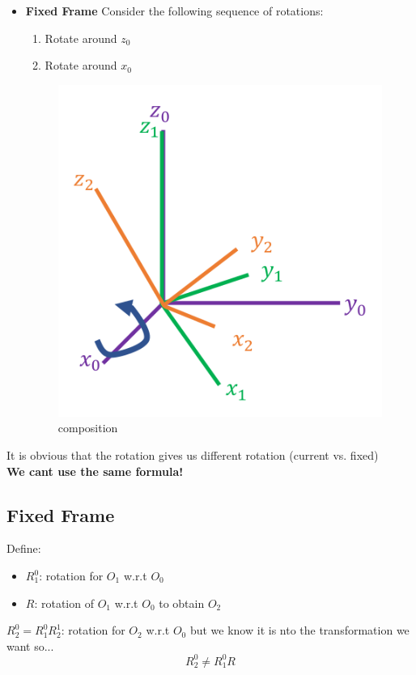 \documentclass{article}
\begin{document}
\begin{itemize}
    \item \textbf{Fixed Frame} Consider the following sequence of rotations:
    \begin{enumerate}
        \item Rotate around $z_0$
        \item Rotate around $x_0$
    \end{enumerate}
    \begin{figure}[h!]
    \centering
    \includegraphics[scale=1.5]{fixedFrame.png}
    \caption{composition}
    \label{fig:sr}
    \end{figure}
\end{itemize}
It is obvious that the rotation gives us different rotation (current vs. fixed)\\
\textbf{We cant use the same formula!}

\subsection{Fixed Frame}
Define:
\begin{itemize}
    \item $R^{0}_1$: rotation for $O_1$ w.r.t $O_0$
    \item $R$: rotation of $O_1$ w.r.t $O_0$ to obtain $O_2$
\end{itemize}

$R^{0}_2 = R^{0}_1 R^{1}_2$: rotation for $O_2$ w.r.t $O_0$ but we know it is nto the transformation we want so... $$R^{0}_2 \ne R^{0}_1 R$$
\end{document}
